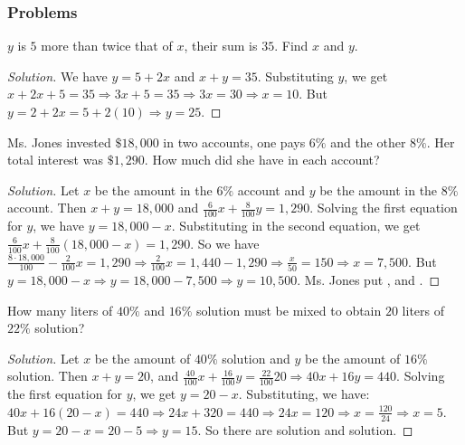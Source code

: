 \documentclass[../main.tex]{subfiles}
\begin{document}
\subsubsection{Problems}
%
\begin{problem}
$y$ is $5$ more than twice that of $x$, their sum is $35$. Find $x$ and $y$.
\end{problem}
\begin{proof}[Solution]
We have $y = 5+2x$ and $x+y = 35$. Substituting $y$, we get $x+2x+5 = 35\Rightarrow 3x+5 = 35\Rightarrow 3x = 30 \Rightarrow \boxed{x = 10}$. But $y = 2+2x = 5+2(10) \Rightarrow \boxed{y= 25}$.
\end{proof}
%
\begin{problem}
Ms. Jones invested $\$18,\!000$ in two accounts, one pays $6\%$ and the other $8\%$. Her total interest was $\$1,\!290$. How much did she have in each account?
\end{problem}
\begin{proof}[Solution]
Let $x$ be the amount in the $6\%$ account and $y$ be the amount in the $8\%$ account. Then $x+y = 18,\!000$ and $\frac{6}{100}x + \frac{8}{100}y = 1,\!290$. Solving the first equation for $y$, we have $y= 18,\!000 - x$. Substituting in the second equation, we get $\frac{6}{100}x + \frac{8}{100}(18,\!000 - x) = 1,\!290$. So we have $\frac{8 \cdot 18,000}{100} - \frac{2}{100}x = 1,\!290 \Rightarrow \frac{2}{100}x = 1,\!440 - 1,\!290 \Rightarrow \frac{x}{50} = 150 \Rightarrow \boxed{x = 7,\!500}$. But $y = 18,\!000 - x \Rightarrow y= 18,\!000 - 7,\!500 \Rightarrow \boxed{y = 10,\!500}$. Ms. Jones put , and .
\end{proof}
%
\begin{problem}
How many liters of $40\%$ and $16\%$ solution must be mixed to obtain $20$ liters of $22\%$ solution?
\end{problem}
\begin{proof}[Solution]
Let $x$ be the amount of $40\%$ solution and $y$ be the amount of $16\%$ solution. Then $x+y = 20$, and $\frac{40}{100}x +\frac{16}{100}y = \frac{22}{100}20\Rightarrow 40x+16y = 440$. Solving the first equation for $y$, we get $y = 20 - x$. Substituting, we have: $40x + 16(20-x) = 440\Rightarrow 24x + 320 = 440 \Rightarrow 24x = 120\Rightarrow x=\frac{120}{24}\Rightarrow \boxed{x = 5}$. But $y = 20 - x = 20 - 5 \Rightarrow \boxed{y = 15}$. So there are  solution and  solution.
\end{proof}
\end{document}
